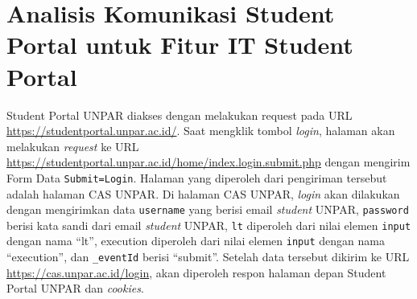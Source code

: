 \section{Analisis Komunikasi Student Portal untuk Fitur IT Student Portal}
Student Portal UNPAR diakses dengan melakukan request pada URL \url{https://studentportal.unpar.ac.id/}. Saat mengklik tombol \textit{login}, halaman akan melakukan \textit{request} ke URL \url{https://studentportal.unpar.ac.id/home/index.login.submit.php} dengan mengirim Form Data \texttt{Submit=Login}. Halaman yang diperoleh dari pengiriman tersebut adalah halaman CAS UNPAR. Di halaman CAS UNPAR, \textit{login} akan dilakukan dengan mengirimkan data \texttt{username} yang berisi email \textit{student} UNPAR, \texttt{password} berisi kata sandi dari email \textit{student} UNPAR, \texttt{lt} diperoleh dari nilai elemen \texttt{input} dengan nama "`lt"', execution diperoleh dari nilai elemen \texttt{input} dengan nama "`execution"', dan \texttt{\_eventId} berisi "`submit"'. Setelah data tersebut dikirim ke URL \url{https://cas.unpar.ac.id/login}, akan diperoleh respon halaman depan Student Portal UNPAR dan \textit{cookies}.
